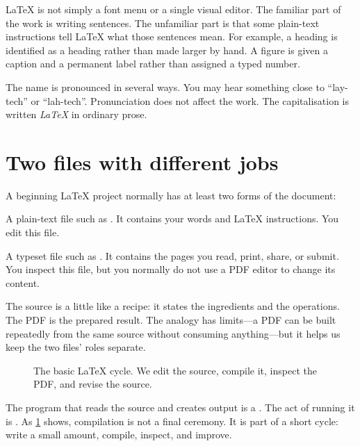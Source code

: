 \LaTeX{} is not simply a font menu or a single visual editor. The familiar part
of the work is writing sentences. The unfamiliar part is that some plain-text
instructions tell \LaTeX{} what those sentences mean. For example, a heading is
identified as a heading rather than made larger by hand. A figure is given a
caption and a permanent label rather than assigned a typed number.

\begin{classroomnote}
The name is pronounced in several ways. You may hear something close to
``lay-tech'' or ``lah-tech''. Pronunciation does not affect the work. The
capitalisation is written \emph{\LaTeX{}} in ordinary prose.
\end{classroomnote}

\section{Two files with different jobs}

A beginning \LaTeX{} project normally has at least two forms of the document:

\begin{description}[style=nextline,leftmargin=1.6em]
  \item[The source file]
  A plain-text file such as . It contains your words and \LaTeX{}
  instructions. You edit this file.

  \item[The output file]
  A typeset file such as . It contains the pages you read,
  print, share, or submit. You inspect this file, but you normally do not use a
  PDF editor to change its content.
\end{description}

The source is a little like a recipe: it states the ingredients and the
operations. The PDF is the prepared result. The analogy has limits---a PDF can
be built repeatedly from the same source without consuming anything---but it
helps us keep the two files' roles separate.

\begin{figure}[htbp]
  \centering
  
  \caption{The basic \LaTeX{} cycle. We edit the source, compile it, inspect the
  PDF, and revise the source.}
  \label{fig:source-to-pdf}
\end{figure}

The program that reads the source and creates output is a .
The act of running it is . As \cref{fig:source-to-pdf}
shows, compilation is not a final ceremony. It is part of a short cycle:
write a small amount, compile, inspect, and improve.


